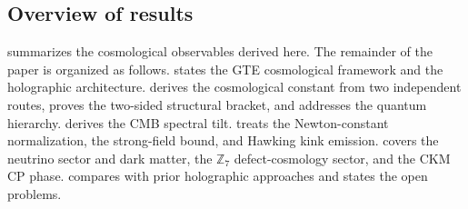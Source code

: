 \documentclass[11pt]{article}
\theoremstyle{remark}
\newcommand{\ZS}{\mathbb{Z}_7}
\begin{document}
\subsection{Overview of results}
\label{sec:overview}

 summarizes the cosmological observables derived here. The
remainder of the paper is organized as follows.  states the
GTE cosmological framework and the holographic architecture. 
derives the cosmological constant from two independent routes, proves the
two-sided structural bracket, and addresses the
quantum hierarchy.  derives the CMB spectral tilt. 
treats the Newton-constant normalization, the strong-field bound, and Hawking
kink emission.  covers the neutrino sector and dark matter,
 the $\ZS$ defect-cosmology sector, and
 the CKM CP phase.  compares with prior
holographic approaches and states the open problems.
\end{document}
